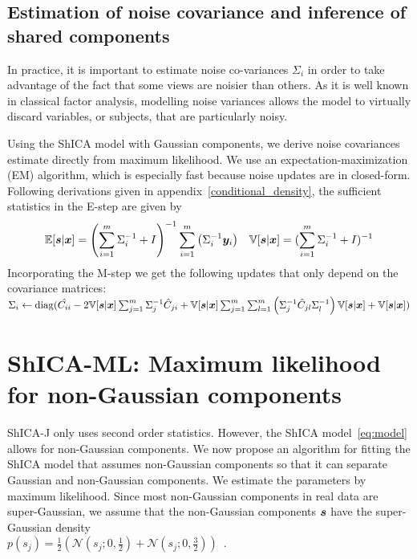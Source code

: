 \subsection{Estimation of noise covariance and inference of shared components}

In practice, it is important to estimate noise co-variances $\Sigma_i$ in order to take advantage of the fact that some views are noisier than others. As it is well known in classical factor analysis, modelling noise variances allows the model to virtually discard variables, or subjects, that are particularly noisy. 

Using the ShICA model with Gaussian components, we derive noise covariances estimate directly from maximum likelihood. We use an expectation-maximization (EM) algorithm, which is especially fast because noise updates are in closed-form. Following derivations given in appendix~\ref{conditional_density}, the sufficient statistics in the E-step are given by 
\begin{align}
\label{mmse1}
\mathbb{E}[\boldsymbol{s}|\boldsymbol{x}]= \left(\sum_{i=1}^m \Sigma_i^{-1}  + I \right)^{-1}  \sum_{i=1}^m \left(\Sigma_i^{-1} \boldsymbol{y}_i \right)
     && \mathbb{V}[\boldsymbol{s}|\boldsymbol{x}]= (\sum_{i=1}^m \Sigma_i^{-1}  + I)^{-1}
\end{align}
Incorporating the M-step we get the following updates that only depend on the covariance matrices:
$
\Sigma_i \leftarrow \operatorname*{diag}(\hat{C_{ii}} - 2 \mathbb{V}[\boldsymbol{s} | \boldsymbol{x}]  \sum_{j=1}^m \Sigma_j^{-1} \hat{C}_{ji}  + \mathbb{V}[\boldsymbol{s} | \boldsymbol{x}]  \sum_{j = 1}^m \sum_{l = 1}^m \left(\Sigma_j^{-1} \hat{C}_{jl} \Sigma_l^{-1} \right) \mathbb{V}[\boldsymbol{s} | \boldsymbol{x}] + \mathbb{V}[\boldsymbol{s} | \boldsymbol{x}])
$

\section{ShICA-ML: Maximum likelihood for non-Gaussian components}
ShICA-J only uses second order statistics. However, the ShICA model~\eqref{eq:model} allows for non-Gaussian components. We now propose an algorithm for fitting the ShICA model that assumes non-Gaussian components so that it can separate Gaussian and non-Gaussian components.
We estimate the parameters by maximum likelihood. Since most non-Gaussian components in real data are super-Gaussian, we assume that the non-Gaussian components $\boldsymbol{s}$ have the super-Gaussian density \\ $p(s_j) = \frac12\left(\mathcal{N}( s_j; 0, \frac12) + \mathcal{N}( s_j; 0, \frac{3}{2})\right) \enspace.$

